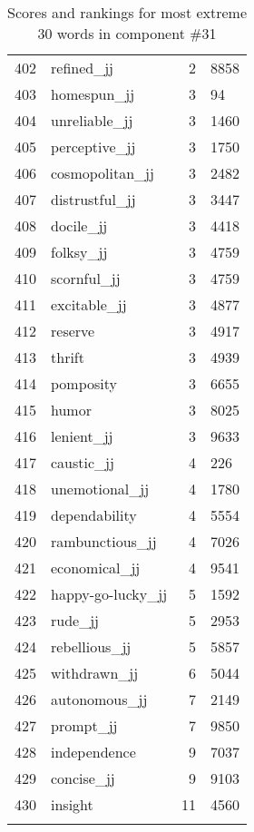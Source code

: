 \begin{longtable}[!htbp]{| rlr@{.}l |}
    402 & refined\_jj & 2 & 8858 \\
    403 & homespun\_jj & 3 & 94 \\
    404 & unreliable\_jj & 3 & 1460 \\
    405 & perceptive\_jj & 3 & 1750 \\
    406 & cosmopolitan\_jj & 3 & 2482 \\
    407 & distrustful\_jj & 3 & 3447 \\
    408 & docile\_jj & 3 & 4418 \\
    409 & folksy\_jj & 3 & 4759 \\
    410 & scornful\_jj & 3 & 4759 \\
    411 & excitable\_jj & 3 & 4877 \\
    412 & reserve & 3 & 4917 \\
    413 & thrift & 3 & 4939 \\
    414 & pomposity & 3 & 6655 \\
    415 & humor & 3 & 8025 \\
    416 & lenient\_jj & 3 & 9633 \\
    417 & caustic\_jj & 4 & 226 \\
    418 & unemotional\_jj & 4 & 1780 \\
    419 & dependability & 4 & 5554 \\
    420 & rambunctious\_jj & 4 & 7026 \\
    421 & economical\_jj & 4 & 9541 \\
    422 & happy-go-lucky\_jj & 5 & 1592 \\
    423 & rude\_jj & 5 & 2953 \\
    424 & rebellious\_jj & 5 & 5857 \\
    425 & withdrawn\_jj & 6 & 5044 \\
    426 & autonomous\_jj & 7 & 2149 \\
    427 & prompt\_jj & 7 & 9850 \\
    428 & independence & 9 & 7037 \\
    429 & concise\_jj & 9 & 9103 \\
    430 & insight & 11 & 4560 \\
    \hline
    \caption{Scores and rankings for most extreme 30 words in component \#31} \\
\end{longtable}
